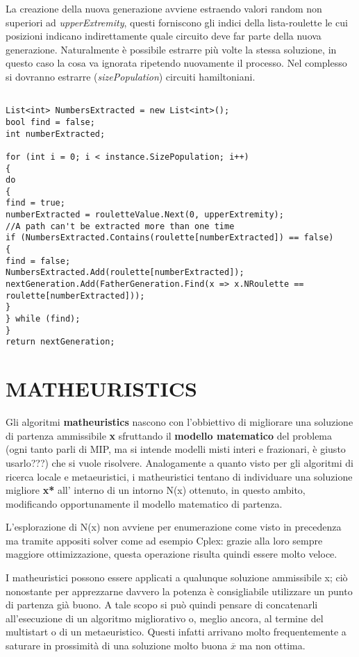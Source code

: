 \documentclass[11pt]{article}
\begin{document}
La creazione della nuova generazione avviene estraendo valori random non superiori ad \textit{upperExtremity}, questi forniscono gli indici della lista-roulette le cui posizioni indicano indirettamente quale circuito deve far parte della nuova generazione. Naturalmente è possibile estrarre più volte la stessa soluzione, in questo caso la cosa va ignorata ripetendo nuovamente il processo. Nel complesso si dovranno estrarre (\textit{sizePopulation}) circuiti hamiltoniani.

\begin{lstlisting}

List<int> NumbersExtracted = new List<int>();
bool find = false;
int numberExtracted;

for (int i = 0; i < instance.SizePopulation; i++)
{
do
{
find = true;
numberExtracted = rouletteValue.Next(0, upperExtremity);
//A path can't be extracted more than one time
if (NumbersExtracted.Contains(roulette[numberExtracted]) == false)
{
find = false;
NumbersExtracted.Add(roulette[numberExtracted]);
nextGeneration.Add(FatherGeneration.Find(x => x.NRoulette == roulette[numberExtracted]));
}
} while (find);
}
return nextGeneration;

\end{lstlisting}

\section*{MATHEURISTICS}
\label{sec:MathEuristiciS}

Gli algoritmi \textbf{matheuristics} nascono con l'obbiettivo di migliorare una soluzione di partenza ammissibile \textbf{x} sfruttando il \textbf{modello matematico} del problema (ogni tanto parli di MIP, ma si intende modelli misti interi e frazionari, è giusto usarlo???) che si vuole risolvere. Analogamente a quanto visto per gli algoritmi di ricerca locale e metaeuristici, i matheuristici tentano di individuare una soluzione migliore \textbf{x*} all' interno di un intorno N(x) ottenuto, in questo ambito, modificando opportunamente il modello matematico di partenza. 

L'esplorazione di N(x) non avviene per enumerazione come visto in precedenza ma tramite appositi solver come ad esempio Cplex: grazie alla loro sempre maggiore ottimizzazione, questa operazione risulta quindi essere molto veloce. 

I matheuristici possono essere applicati a qualunque soluzione ammissibile x; ciò nonostante per apprezzarne davvero la potenza è consigliabile utilizzare un punto di partenza già buono. A tale scopo si può quindi pensare di concatenarli  all'esecuzione di un algoritmo migliorativo o, meglio ancora, al termine del multistart o di un metaeuristico. Questi infatti arrivano molto frequentemente a saturare in prossimità di una soluzione molto buona \textbf{$\overline{x}$} ma non ottima.
\end{document}
